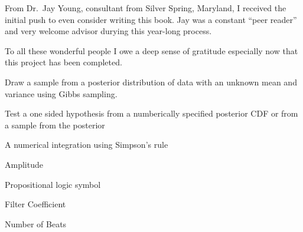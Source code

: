 \documentclass{wileySix}
\begin{document}
\begin{acknowledgments}
From Dr.~Jay Young, consultant from Silver Spring, Maryland, I received
the initial push to even consider writing this book. Jay was a constant
``peer reader'' and very welcome advisor durying this year-long process.


To all these wonderful people I owe a deep sense of gratitude especially now
that this project has been completed.
\end{acknowledgments}

\begin{acronyms}
\end{acronyms}

\begin{glossary}
Draw a sample from a posterior distribution
of data with an unknown mean and variance using Gibbs sampling.

Test a one sided hypothesis from a numberically
specified posterior CDF or from a sample from the posterior

A numerical integration using Simpson's rule
\end{glossary}

\begin{symbols}
Amplitude

\term{\hbox{\&}}Propositional logic symbol

Filter Coefficient

\bigskip

Number of Beats
\end{symbols}
\end{document}
